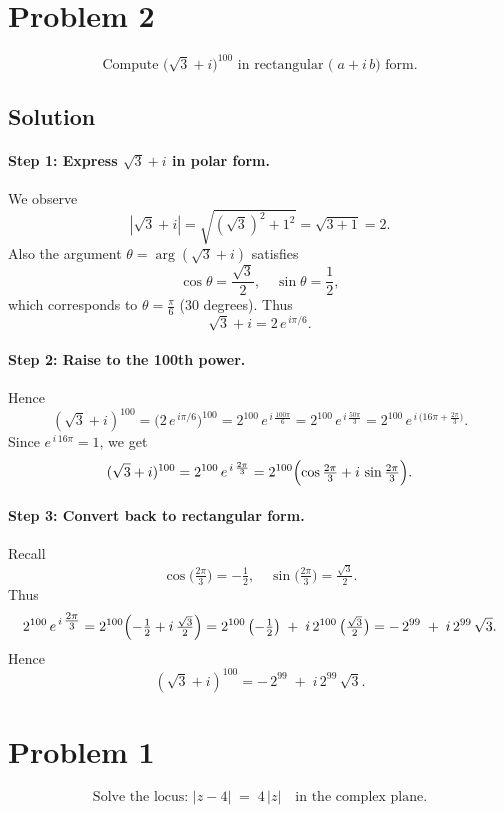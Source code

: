 \documentclass[12pt]{article}
\theoremstyle{definition} %
\theoremstyle{plain} %
\begin{document}
\section*{Problem 2}
\[
\text{Compute } \bigl(\sqrt{3} + i\bigr)^{100}\text{ in rectangular (}\;a + i\,b\text{) form}.
\]

\subsection*{Solution}

\paragraph{Step 1: Express $\sqrt{3}+i$ in polar form.}
We observe
\[
|\sqrt{3} + i|
= \sqrt{(\sqrt{3})^2 + 1^2}
= \sqrt{3 + 1}
= 2.
\]
Also the argument $\theta = \arg(\sqrt{3}+i)$ satisfies
\[
\cos\theta = \frac{\sqrt{3}}{2}, 
\quad
\sin\theta = \frac{1}{2},
\]
which corresponds to $\theta = \frac{\pi}{6}$ (30 degrees).  Thus
\[
\sqrt{3} + i = 2\,e^{\,i\pi/6}.
\]

\paragraph{Step 2: Raise to the 100th power.}
Hence
\[
(\sqrt{3} + i)^{100}
= \bigl(2\,e^{\,i\pi/6}\bigr)^{100}
= 2^{100}\,e^{\,i\,\frac{100\pi}{6}}
= 2^{100}\,e^{\,i\,\frac{50\pi}{3}}
= 2^{100}\,e^{\,i\,\bigl(16\pi + \tfrac{2\pi}{3}\bigr)}.
\]
Since $e^{\,i\,16\pi} = 1$, we get
\[
(\sqrt{3} + i)^{100}
= 2^{100}\,e^{\,i\,\frac{2\pi}{3}}
= 2^{100}\Bigl(\cos\tfrac{2\pi}{3} + i\,\sin\tfrac{2\pi}{3}\Bigr).
\]

\paragraph{Step 3: Convert back to rectangular form.}
Recall
\[
\cos\!\bigl(\tfrac{2\pi}{3}\bigr) = -\tfrac12,
\quad
\sin\!\bigl(\tfrac{2\pi}{3}\bigr) = \tfrac{\sqrt{3}}{2}.
\]
Thus
\[
2^{100}\,e^{\,i\,\tfrac{2\pi}{3}}
= 2^{100}\Bigl(-\tfrac12 + i\,\tfrac{\sqrt{3}}{2}\Bigr)
= 2^{100}\,\bigl(-\tfrac12\bigr) \;+\; i\,2^{100}\,\bigl(\tfrac{\sqrt{3}}{2}\bigr)
= -\,2^{99} \;+\; i\,2^{99}\,\sqrt{3}.
\]
Hence
\[
\boxed{(\sqrt{3} + i)^{100}
= -\,2^{99} \;+\; i\,2^{99}\,\sqrt{3}.}
\]

\section*{Problem 1}
\[
\text{Solve the locus: }|z - 4| \;=\; 4\,|z|\quad\text{in the complex plane}.
\]
\end{document}
